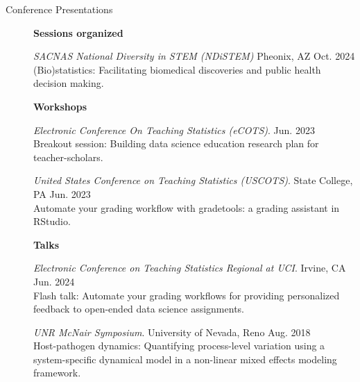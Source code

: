 \documentclass{article}
\begin{document}
	
	\begin{description}
		\vspace{-2mm}
		\item[Conference Presentations]\hspace*{.1in}
		
		\textbf{Sessions organized}
		
		\setlength{\leftskip}{0.5cm}
		
		\vspace*{1mm}	
		
		\textit{SACNAS National Diversity in STEM (NDiSTEM)} Pheonix, AZ \hfill{Oct. 2024}\\
		(Bio)statistics: Facilitating biomedical discoveries and public health decision making.
		
		\vspace*{1mm}	
		
		
		\setlength{\leftskip}{0cm}
		
		\textbf{Workshops}
		
		\setlength{\leftskip}{0.5cm}
		
		\vspace*{1mm}	
		
		\textit{Electronic Conference On Teaching Statistics (eCOTS)}. \hfill{Jun. 2023}\\
		Breakout session: Building data science education research plan for teacher-scholars.
		\vspace*{1mm}	
		
		\textit{United States Conference on Teaching Statistics (USCOTS)}. State College, PA \hfill{Jun. 2023}\\ 
		Automate your grading workflow with gradetools: a grading assistant in RStudio.
		
		\setlength{\leftskip}{0cm}
		
		\textbf{Talks}
		
		\setlength{\leftskip}{0.5cm}
		
		\vspace*{1mm}	
		
		\textit{Electronic Conference on Teaching Statistics Regional at UCI}. Irvine, CA \hfill{Jun. 2024}\\
		Flash talk: Automate your grading workflows for providing personalized feedback to open-ended data science assignments.
		\vspace*{1mm}
		
		\textit{UNR McNair Symposium}. University of Nevada, Reno \hfill{Aug. 2018}\\
		Host-pathogen dynamics: Quantifying process-level variation using a system-specific dynamical model in a non-linear mixed effects modeling framework.
		\vspace*{1mm}
		

\end{description}
\end{document}
